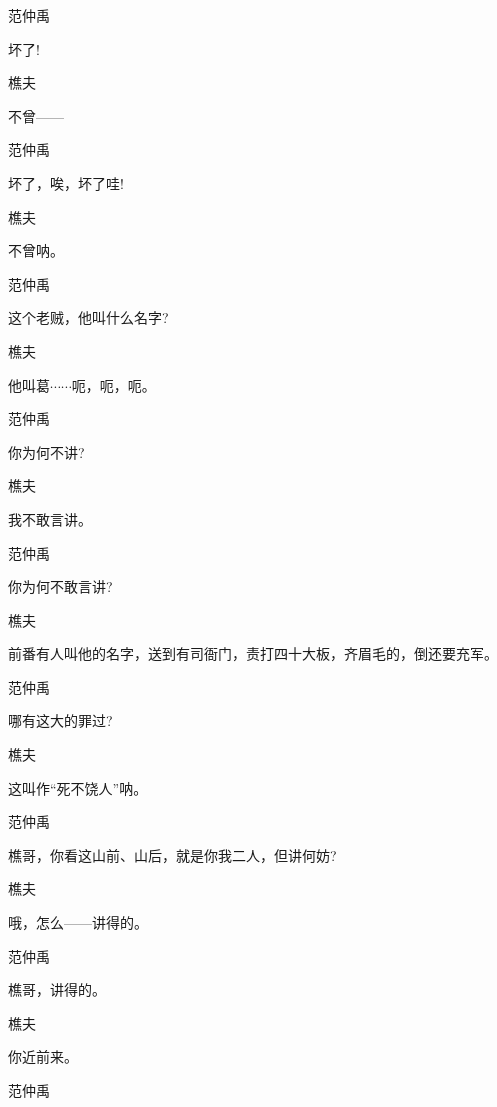 范仲禹\hspace{20pt}~

坏了!

樵夫\hspace{30pt}~

不曾------

范仲禹\hspace{20pt}~

坏了，唉，坏了哇!

樵夫\hspace{30pt}~

不曾呐。

范仲禹\hspace{20pt}~

这个老贼，他叫什么名字?

樵夫\hspace{30pt}~

他叫葛$\cdots{}\cdots{}$呃，呃，呃。

范仲禹\hspace{20pt}~

你为何不讲?

樵夫\hspace{30pt}~

我不敢言讲。

范仲禹\hspace{20pt}~

你为何不敢言讲?

樵夫

前番有人叫他的名字，送到有司衙门，责打四十大板，齐眉毛的，倒还要充军。

范仲禹\hspace{20pt}~

哪有这大的罪过?

樵夫\hspace{30pt}~

这叫作``死不饶人''呐。

范仲禹\hspace{20pt}~

樵哥，你看这山前、山后，就是你我二人，但讲何妨?

樵夫\hspace{30pt}~

哦，怎么------讲得的。

范仲禹\hspace{20pt}~

樵哥，讲得的。

樵夫\hspace{30pt}~

你近前来。

范仲禹\hspace{20pt}~


